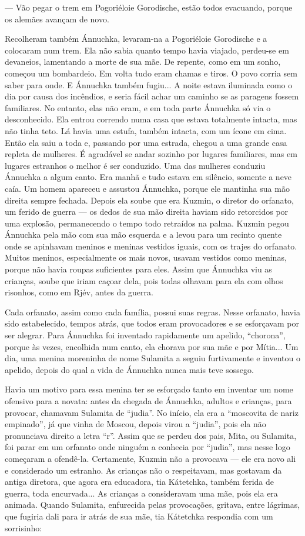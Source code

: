 --- Vão pegar o trem em Pogoriéloie Gorodische, estão todos evacuando,
porque os alemães avançam de novo.

Recolheram também Ánnuchka, levaram-na a Pogoriéloie Gorodische e a
colocaram num trem. Ela não sabia quanto tempo havia viajado, perdeu-se
em devaneios, lamentando a morte de sua mãe. De repente, como em um
sonho, começou um bombardeio. Em volta tudo eram chamas e tiros. O povo
corria sem saber para onde. E Ánnuchka também fugiu... A noite estava
iluminada como o dia por causa dos incêndios, e seria fácil achar um
caminho se as paragens fossem familiares. No entanto, elas não eram, e
em toda parte Ánnuchka só via o desconhecido. Ela entrou correndo numa
casa que estava totalmente intacta, mas não tinha teto. Lá havia uma
estufa, também intacta, com um ícone em cima. Então ela saiu a toda e,
passando por uma estrada, chegou a uma grande casa repleta de mulheres.
É agradável se andar sozinho por lugares familiares, mas em lugares
estranhos o melhor é ser conduzido. Uma das mulheres conduziu Ánnuchka a
algum canto. Era manhã e tudo estava em silêncio, somente a neve caía.
Um homem apareceu e assustou Ánnuchka, porque ele mantinha sua mão
direita sempre fechada. Depois ela soube que era Kuzmin, o diretor do
orfanato, um ferido de guerra --- os dedos de sua mão direita haviam
sido retorcidos por uma explosão, permanecendo o tempo todo retraídos na
palma. Kuzmin pegou Ánnuchka pela mão com sua mão esquerda e a levou
para um recinto quente onde se apinhavam meninos e meninas vestidos
iguais, com os trajes do orfanato. Muitos meninos, especialmente os mais
novos, usavam vestidos como meninas, porque não havia roupas suficientes
para eles. Assim que Ánnuchka viu as crianças, soube que iriam caçoar
dela, pois todas olhavam para ela com olhos risonhos, como em Rjév,
antes da guerra.

Cada orfanato, assim como cada família, possui suas regras. Nesse
orfanato, havia sido estabelecido, tempos atrás, que todos eram
provocadores e se esforçavam por ser alegrar. Para Ánnuchka foi
inventado rapidamente um apelido, ``chorona'', porque às vezes,
encolhida num canto, ela chorava por sua mãe e por Mítia... Um dia, uma
menina moreninha de nome Sulamita a seguiu furtivamente e inventou o
apelido, depois do qual a vida de Ánnuchka nunca mais teve sossego.

Havia um motivo para essa menina ter se esforçado tanto em inventar um
nome ofensivo para a novata: antes da chegada de Ánnuchka, adultos e
crianças, para provocar, chamavam Sulamita de ``judia''. No início, ela
era a ``moscovita de nariz empinado'', já que vinha de Moscou, depois
virou a ``judia'', pois ela não pronunciava direito a letra ``r''. Assim
que se perdeu dos pais, Mita, ou Sulamita, foi parar em um orfanato onde
ninguém a conhecia por ``judia'', mas nesse logo começaram a ofendê-la.
Certamente, Kuzmin não a provocava --- ele era novo ali e considerado um
estranho. As crianças não o respeitavam, mas gostavam da antiga
diretora, que agora era educadora, tia Kátetchka, também ferida de
guerra, toda encurvada... As crianças a consideravam uma mãe, pois ela
era animada. Quando Sulamita, enfurecida pelas provocações, gritava,
entre lágrimas, que fugiria dali para ir atrás de sua mãe, tia Kátetchka
respondia com um sorrisinho:

